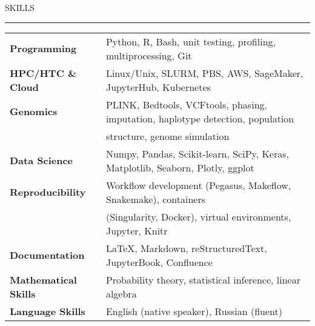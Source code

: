 \documentclass{resume} %
\renewenvironment{rSection}[1]{
\sectionskip
\textcolor{RoyalPurple}{\MakeUppercase{#1}}
\sectionlineskip
\hrule
\begin{list}{}{
\setlength{\leftmargin}{1.5em}
}
\item[]
}{
\end{list}
}
\begin{document}
\begin{rSection}{Skills}

\begin{tabular}{ @{} >{\bfseries}l @{\hspace{6ex}} l }
Programming & Python, R, Bash, unit testing, profiling, multiprocessing, Git\\
HPC/HTC \& Cloud & Linux/Unix, SLURM, PBS, AWS, SageMaker, JupyterHub, Kubernetes  \\
Genomics & PLINK, Bedtools, VCFtools, phasing, imputation, haplotype detection, population \\ & structure, genome simulation\\
Data Science & Numpy, Pandas, Scikit-learn, SciPy, Keras, Matplotlib, Seaborn, Plotly, ggplot \\
Reproducibility & Workflow development (Pegasus, Makeflow, Snakemake), containers \\ & (Singularity, Docker), virtual environments, Jupyter, Knitr \\
Documentation & \LaTeX, Markdown, reStructuredText, JupyterBook, Confluence \\
Mathematical Skills & Probability theory, statistical inference, linear algebra \\
Language Skills & English (native speaker), Russian (fluent) \\
\end{tabular}

\end{rSection}

\end{document}
